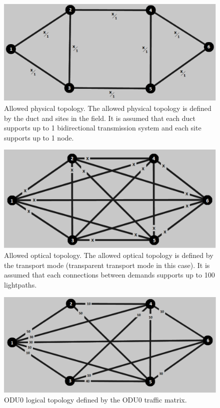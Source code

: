 \begin{figure}[H]
\centering
\includegraphics[width=13cm]{sdf/heuristic/transparent_protection/figures/allowed_physical}
\caption{Allowed physical topology. The allowed physical topology is defined by the duct and sites in the field. It is assumed that each duct supports up to 1 bidirectional transmission system and each site supports up to 1 node.}
\label{allowed_physical_protection_ref_medium_heuristic_transparent}
\end{figure}

\begin{figure}[H]
\centering
\includegraphics[width=13cm]{sdf/heuristic/transparent_protection/figures/allowed_optical}
\caption{Allowed optical topology. The allowed optical topology is defined by the transport mode (transparent transport mode in this case). It is assumed that each connections between demands supports up to 100 lightpaths.}
\label{allowed_optical_protection_ref_medium_heuristic_transparent}
\end{figure}

\begin{figure}[H]
\centering
\includegraphics[width=13cm]{sdf/heuristic/transparent_protection/figures/logical_topology_odu0_medium}
\caption{ODU0 logical topology defined by the ODU0 traffic matrix.}
\label{logical_ODU0_protection_ref_medium_heuristic_transparent}
\end{figure}


